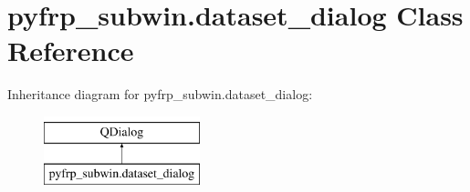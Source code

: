 \hypertarget{classpyfrp__subwin_1_1dataset__dialog}{\section{pyfrp\+\_\+subwin.\+dataset\+\_\+dialog Class Reference}
\label{classpyfrp__subwin_1_1dataset__dialog}
}
Inheritance diagram for pyfrp\+\_\+subwin.\+dataset\+\_\+dialog\+:\begin{figure}[H]
\begin{center}
\leavevmode
\includegraphics[height=2.000000cm]{classpyfrp__subwin_1_1dataset__dialog}
\end{center}
\end{figure}
